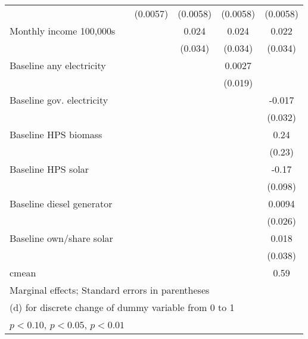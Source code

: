 \begin{table}[htbp]
\begin{tabular*}{1\hsize}{@{\hskip\tabcolsep\extracolsep\fill}l*{5}{c}}
                &                  & (0.0057)         & (0.0058)         & (0.0058)         & (0.0058)         \\
Monthly income 100,000s&                  &                  &    0.024         &    0.024         &    0.022         \\
                &                  &                  &  (0.034)         &  (0.034)         &  (0.034)         \\
Baseline any electricity&                  &                  &                  &   0.0027         &                  \\
                &                  &                  &                  &  (0.019)         &                  \\
Baseline gov. electricity&                  &                  &                  &                  &   -0.017         \\
                &                  &                  &                  &                  &  (0.032)         \\
Baseline HPS biomass&                  &                  &                  &                  &     0.24         \\
                &                  &                  &                  &                  &   (0.23)         \\
Baseline HPS solar&                  &                  &                  &                  &    -0.17\sym{*}  \\
                &                  &                  &                  &                  &  (0.098)         \\
Baseline diesel generator&                  &                  &                  &                  &   0.0094         \\
                &                  &                  &                  &                  &  (0.026)         \\
Baseline own/share solar&                  &                  &                  &                  &    0.018         \\
                &                  &                  &                  &                  &  (0.038)         \\
\midrule
cmean           &                  &                  &                  &                  &     0.59         \\
\bottomrule
\multicolumn{6}{l}{\footnotesize Marginal effects; Standard errors in parentheses}\\
\multicolumn{6}{l}{\footnotesize  (d) for discrete change of dummy variable from 0 to 1}\\
\multicolumn{6}{l}{\footnotesize \sym{*} \(p<0.10\), \sym{**} \(p<0.05\), \sym{***} \(p<0.01\)}\\
\end{tabular*}
\end{table}
